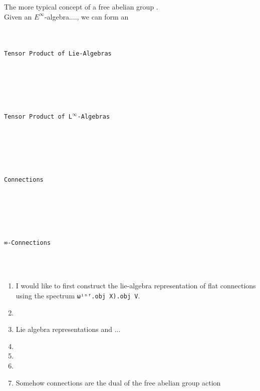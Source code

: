 \documentclass{book}
\theoremstyle{definition}
\renewcommand{\chapter}[1]{
\newpage
{
\Huge 
\begin{center}
\ \\
\ \\
\thispagestyle{empty}
\texttt{#1}
\end{center}}
\ \\
\ \\
}
\begin{document}

The more typical concept of a free abelian group .\\


Given an $E^{\infty}$-algebra...., we can form an \\



\newpage
\chapter{Tensor Product of Lie-Algebras}




\newpage
\chapter{Tensor Product of L${}^{\infty}$-Algebras}




\newpage
\chapter{Connections}

\newpage
\chapter{∞-Connections}

\begin{enumerate}
\item I would like to first construct the lie-algebra representation of flat connections using the spectrum \texttt{ωⁱⁿᶠ.obj X).obj V}.
\item 
\item Lie algebra representations and ...
\item 
\item 
\item 
\item Somehow connections are the dual of the free abelian group action
\end{enumerate}
\end{document}
